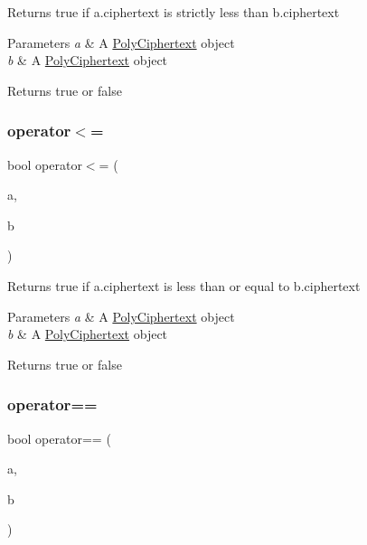 Returns true if {\ttfamily a.\+ciphertext} is strictly less than {\ttfamily b.\+ciphertext} 
\begin{DoxyParams}{Parameters}
{\em a} & A {\ttfamily \hyperlink{classPolyCiphertext}{Poly\+Ciphertext}} object \\
\hline
{\em b} & A {\ttfamily \hyperlink{classPolyCiphertext}{Poly\+Ciphertext}} object \\
\hline
\end{DoxyParams}
\begin{DoxyReturn}{Returns}
{\ttfamily true} or {\ttfamily false} 
\end{DoxyReturn}
\mbox{\label{classPolyCiphertext_a3199ddbed52caee0d591894b60389144}} 
\subsubsection{\texorpdfstring{operator$<$=}{operator<=}}
{\footnotesize\ttfamily bool operator$<$= (\begin{DoxyParamCaption}\item[{const \hyperlink{classPolyCiphertext}{Poly\+Ciphertext} \&}]{a,  }\item[{const \hyperlink{classPolyCiphertext}{Poly\+Ciphertext} \&}]{b }\end{DoxyParamCaption})\hspace{0.3cm}{\ttfamily [friend]}}

Returns true if {\ttfamily a.\+ciphertext} is less than or equal to {\ttfamily b.\+ciphertext} 
\begin{DoxyParams}{Parameters}
{\em a} & A {\ttfamily \hyperlink{classPolyCiphertext}{Poly\+Ciphertext}} object \\
\hline
{\em b} & A {\ttfamily \hyperlink{classPolyCiphertext}{Poly\+Ciphertext}} object \\
\hline
\end{DoxyParams}
\begin{DoxyReturn}{Returns}
{\ttfamily true} or {\ttfamily false} 
\end{DoxyReturn}
\mbox{\label{classPolyCiphertext_a441251a147b7c15eccf64048ba9fb0fe}} 
\subsubsection{\texorpdfstring{operator==}{operator==}}
{\footnotesize\ttfamily bool operator== (\begin{DoxyParamCaption}\item[{const \hyperlink{classPolyCiphertext}{Poly\+Ciphertext} \&}]{a,  }\item[{const \hyperlink{classPolyCiphertext}{Poly\+Ciphertext} \&}]{b }\end{DoxyParamCaption})\hspace{0.3cm}{\ttfamily [friend]}}

